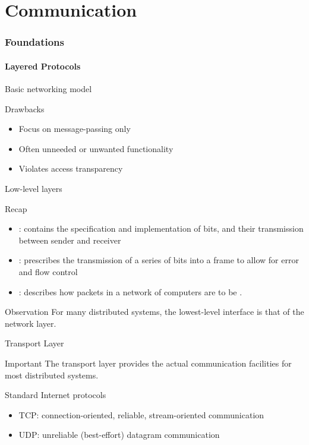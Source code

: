 \part{Communication}
\section{Foundations}
\subsection{Layered Protocols}
\begin{slide}{Basic networking model}
  \begin{block}{}
    \begin{center}
    \end{center}
  \end{block}
  \begin{block}{Drawbacks}
    \begin{itemize}\tightlist
    \item Focus on message-passing only
    \item Often unneeded or unwanted functionality 
    \item Violates access transparency
    \end{itemize}
  \end{block}
\end{slide}
\begin{slide}{Low-level layers}
  \begin{block}{Recap}
    \begin{itemize}\tightlist
    \item {}: contains the specification and implementation of bits, and their transmission
      between sender and receiver
    \item {}: prescribes the transmission of a series of bits into a frame to allow for
      error and flow control
    \item {}: describes how packets in a network of computers are to be .
    \end{itemize}
  \end{block}
  \begin{block}{Observation} 
    For many distributed systems, the lowest-level interface is that of the network layer. 
  \end{block}
\end{slide}
\begin{slide}{Transport Layer}
  \begin{alertblock}{Important} 
    The transport layer provides the actual communication facilities for most distributed systems.
  \end{alertblock}
  \begin{block}{Standard Internet protocols}
    \begin{itemize}\tightlist
    \item TCP: connection-oriented, reliable, stream-oriented communication
    \item UDP: unreliable (best-effort) datagram communication
    \end{itemize}
  \end{block}
\end{slide}
